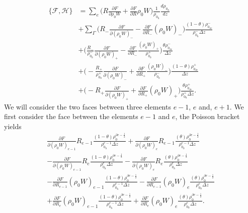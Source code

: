 \documentclass[a4paper,11pt]{article}
\begin{document}
  \begin{equation}
\begin{aligned}
 \{ \mathcal{F},  \mathcal{H}\} &= \sum_e \bigg( R \frac{\partial F}{\partial \rho_0 W} + \frac{\partial F }{\partial R}\rho_0 W \bigg)\frac{1}{\rho_{0{{}_h}}} \frac{d\rho_{0{{}_h}}}{dz}\\
  &+ \sum_\Gamma \bigg ( R_-\frac{\partial F}{\partial (\rho_0 W)_-} - \frac{\partial F}{\partial R_-} (\rho_0 W)_-\bigg  ) \frac{(1-\theta)\rho^-_{0{{}_{\partial e}}}}{\rho_{0{{}_h}}^-\Delta z} \\ &+  \bigg  ( \frac{R_-}{\rho_{0{{}_h}}^-}\frac{\partial F}{\partial (\rho_0 W)_+} - \frac{\partial F}{\partial R_-} \frac{(\rho_0 W)_+}{\rho_{0{{}_h}}^+}\bigg  ) \frac{\theta \rho^-_{0{{}_{\partial e}}}}{\Delta z}\\
 & + \bigg  ( - \frac{ R_+}{\rho_{0{{}_h}}^+}\frac{\partial F}{\partial (\rho_0 W)_-} + \frac{\partial F}{\partial R_+} \frac{(\rho_0 W)_-}{\rho_{0{{}_h}}^-}\bigg  ) \frac{(1-\theta) \rho^+_{0{{}_{\partial e}}}}{\Delta z}\\  &+ \bigg  ( -  R_+\frac{\partial F}{\partial (\rho_0 W)_+} + \frac{\partial F}{\partial R_+}(\rho_0 W)_+\bigg  )\frac{\theta \rho^+_{0{{}_{\partial e}}}}{\rho_{0{{}_h}}^+\Delta z}.
 \end{aligned}
 \end{equation}
We will consider the two faces between three elements $e-1$, $e$ and, $e+ 1$. We first consider the face between the elements  $e-1$ and  $e$, the Poisson bracket yields
\begin{equation}
\begin{aligned}
\frac{\partial F}{\partial (\rho_0 W)_{e-1}}R_{e-1}\frac{(1-\theta)\rho_0^{\partial e - \frac{1}{2}}}{\rho_{0{{}_h}}^{e-1}\Delta z}  + \frac{\partial F}{\partial (\rho_0 W)_{e}}R_{e-1} \frac{(\theta)\rho_0^{\partial e - \frac{1}{2}}}{\rho_{0{{}_h}}^{e-1}\Delta z}\\ - \frac{\partial F}{\partial (\rho_0 W)_{e-1}}R_{e}\frac{(1-\theta)\rho_0^{\partial e - \frac{1}{2}}}{\rho_{0{{}_h}}^{e}\Delta z}  -\frac{\partial F}{\partial (\rho_0 W)_{e}}R_{e} \frac{(\theta)\rho_0^{\partial e - \frac{1}{2}}}{\rho_{0{{}_h}}^{e}\Delta z}\\
-\frac{\partial F}{\partial R_{e-1}}(\rho_0 W)_{e-1}\frac{(1-\theta)\rho_0^{\partial e - \frac{1}{2}}}{\rho_{0{{}_h}}^{e-1}\Delta z}  -\frac{\partial F}{\partial R_{e-1}}(\rho_0 W)_{e} \frac{(\theta)\rho_0^{\partial e - \frac{1}{2}}}{\rho_{0{{}_h}}^{e}\Delta z} \\+\frac{\partial F}{\partial R_{e}}(\rho_0 W)_{e-1}\frac{(1-\theta)\rho_0^{\partial e - \frac{1}{2}}}{\rho_{0{{}_h}}^{e-1}\Delta z}  +\frac{\partial F}{\partial R_{e}}(\rho_0 W)_{e} \frac{(\theta)\rho_0^{\partial e - \frac{1}{2}}}{\rho_{0{{}_h}}^{e}\Delta z}.
\end{aligned}
\end{equation}
\end{document}
